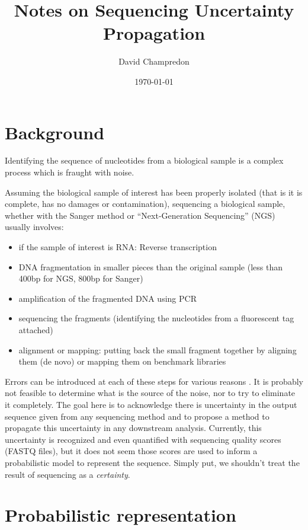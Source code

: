 \documentclass[12pt]{article}
\title{Notes on Sequencing Uncertainty Propagation}
\author{David Champredon}
\date{\today}                                           %
\begin{document}
\maketitle

\section{Background}

Identifying the sequence of nucleotides from a biological sample is a complex process which is fraught with noise. 

Assuming the biological sample of interest has been properly isolated (that is it is complete, has no damages or contamination), sequencing a biological sample, whether with the Sanger method or ``Next-Generation Sequencing'' (NGS) usually involves:
\begin{itemize}
\item if the sample of interest is RNA: Reverse transcription 
\item DNA fragmentation in smaller pieces than the original sample (less than 400bp for NGS, 800bp for Sanger)
\item amplification of the fragmented DNA using PCR
\item sequencing the fragments (identifying the nucleotides from a fluorescent tag attached)
\item alignment or mapping: putting back the small fragment together by aligning them (de novo) or mapping them on benchmark libraries
\end{itemize}


Errors can be introduced at each of these steps for various reasons \cite{Beerenwinkel:2011}. It is probably not feasible to determine what is the source of the noise, nor to try to eliminate it completely.
The goal here is to acknowledge there is uncertainty in the output sequence given from any sequencing method and to propose a method to propagate this uncertainty in any downstream analysis.
Currently, this uncertainty is recognized and even quantified with sequencing quality scores (FASTQ files), but it does not seem those scores are used to inform a probabilistic model to represent the sequence. 
Simply put, we shouldn't treat the result of sequencing as a \emph{certainty}.




\section{Probabilistic representation}
\end{document}
